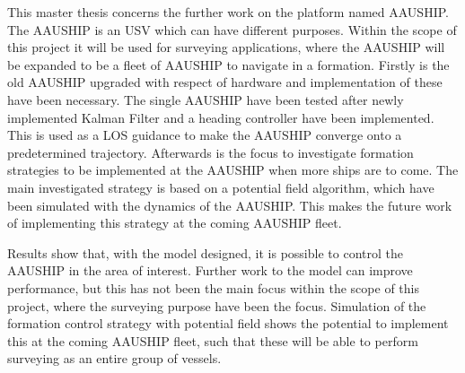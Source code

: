 This master thesis concerns the further work on the platform named AAUSHIP. The AAUSHIP is an USV which can have different purposes. Within the scope of this project it will be used for surveying applications, where the AAUSHIP will be expanded to be a fleet of AAUSHIP to navigate in a formation. Firstly is the old AAUSHIP upgraded with respect of hardware and implementation of these have been necessary. The single AAUSHIP have been tested after newly implemented Kalman Filter and a heading controller have been implemented. This is used as a LOS guidance to make the AAUSHIP converge onto a predetermined trajectory. Afterwards is the focus to investigate formation strategies to be implemented at the AAUSHIP when more ships are to come. The main investigated strategy is based on a potential field algorithm, which have been simulated with the dynamics of the AAUSHIP. This makes the future work of implementing this strategy at the coming AAUSHIP fleet.

Results show that, with the model designed, it is possible to control the AAUSHIP in the area of interest. Further work to the model can improve performance, but this has not been the main focus within the scope of this project, where the surveying purpose have been the focus. Simulation of the formation control strategy with potential field shows the potential to implement this at the coming AAUSHIP fleet, such that these will be able to perform surveying as an entire group of vessels.